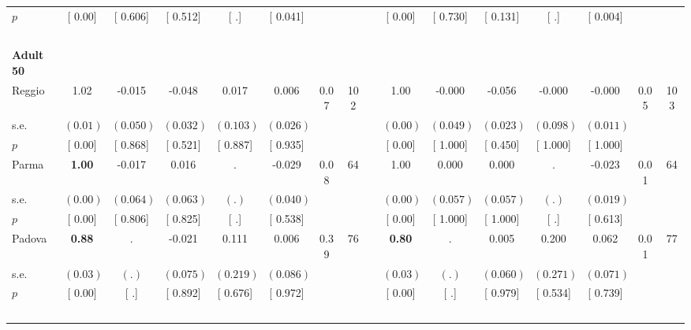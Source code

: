 \begin{longtable}{L{8em} c c c c c c c p{1em} c c c c c c c}
\quad \quad \quad \quad $ p$ & [     0.00] & [    0.606] & [    0.512] & [        .] & [    0.041] & & & & [     0.00] & [    0.730] & [    0.131] & [        .] & [    0.004] & &  \\[1em]
~\\[1em]
\quad \quad \textbf{Adult 50} & & & & & & & & & & & & & & & \\* 
\quad \quad \quad Reggio& 1.02 &    -0.015 &    -0.048 &     0.017 &     0.006 &      0.07 &       102 & & 1.00 &    -0.000 &    -0.056 &    -0.000 &    -0.000 &      0.05 &       103  \\*
\quad \quad \quad \quad s.e.& $ (     0.01)$ & $ (    0.050)$ & $ (    0.032)$ & $ (    0.103)$ & $ (    0.026)$ & & & & $ (     0.00)$ & $ (    0.049)$ & $ (    0.023)$ & $ (    0.098)$ & $ (    0.011)$ & &  \\*
\quad \quad \quad \quad $ p$ & [     0.00] & [    0.868] & [    0.521] & [    0.887] & [    0.935] & & & & [     0.00] & [    1.000] & [    0.450] & [    1.000] & [    1.000] & &  \\[1em]
\quad \quad \quad Parma& \textbf{     1.00} &    -0.017 &     0.016 &         . &    -0.029 &      0.08 &        64 & & 1.00 &     0.000 &     0.000 &         . &    -0.023 &      0.01 &        64  \\*
\quad \quad \quad \quad s.e.& $ (     0.00)$ & $ (    0.064)$ & $ (    0.063)$ & $ (        .)$ & $ (    0.040)$ & & & & $ (     0.00)$ & $ (    0.057)$ & $ (    0.057)$ & $ (        .)$ & $ (    0.019)$ & &  \\*
\quad \quad \quad \quad $ p$ & [     0.00] & [    0.806] & [    0.825] & [        .] & [    0.538] & & & & [     0.00] & [    1.000] & [    1.000] & [        .] & [    0.613] & &  \\[1em]
\quad \quad \quad Padova& \textbf{     0.88} &         . &    -0.021 &     0.111 &     0.006 &      0.39 &        76 & & \textbf{     0.80} &         . &     0.005 &     0.200 &     0.062 &      0.01 &        77  \\*
\quad \quad \quad \quad s.e.& $ (     0.03)$ & $ (        .)$ & $ (    0.075)$ & $ (    0.219)$ & $ (    0.086)$ & & & & $ (     0.03)$ & $ (        .)$ & $ (    0.060)$ & $ (    0.271)$ & $ (    0.071)$ & &  \\*
\quad \quad \quad \quad $ p$ & [     0.00] & [        .] & [    0.892] & [    0.676] & [    0.972] & & & & [     0.00] & [        .] & [    0.979] & [    0.534] & [    0.739] & &  \\[1em]
~\\[1em]

\end{longtable}
